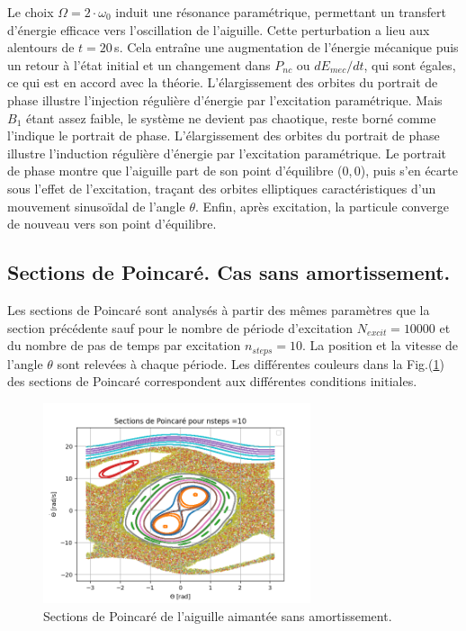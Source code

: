 \documentclass[a4paper,12pt,twoside]{article}
\begin{document}
Le choix $\Omega = 2 \cdot \omega_0$ induit une résonance paramétrique, permettant un transfert d’énergie efficace vers l’oscillation de l’aiguille. Cette perturbation a lieu aux alentours de $t=20$\,s. Cela entraîne une augmentation de l’énergie mécanique puis un retour à l'état initial et un changement dans $P_{nc}$ ou $dE_{mec}/dt$, qui sont égales, ce qui est en accord avec la théorie. L'élargissement des orbites du portrait de phase illustre l’injection régulière d’énergie par l’excitation paramétrique. Mais $B_1$ étant assez faible, le système ne devient pas chaotique, reste borné comme l'indique le portrait de phase. L'élargissement des orbites du portrait de phase illustre l’induction régulière d’énergie par l’excitation paramétrique. Le portrait de phase montre que l’aiguille part de son point d’équilibre (0,\,0), puis s’en écarte sous l’effet de l’excitation, traçant des orbites elliptiques caractéristiques d’un mouvement sinusoïdal de l’angle $\theta$. Enfin, après excitation, la particule converge de nouveau vers son point d’équilibre.


\vspace{-0.5cm}

\subsection{Sections de Poincaré. Cas sans amortissement.}  \label{sec3.4}

\vspace{-0.3cm}

Les sections de Poincaré sont analysés à partir des mêmes paramètres que la section précédente sauf pour le nombre de période d'excitation $N_{excit}=10000$ et du nombre de pas de temps par excitation $n_{steps}=10$. La position et la vitesse de l'angle $\theta$ sont relevées à chaque période. Les différentes couleurs dans la Fig.(\ref{fig6}) des sections de Poincaré correspondent aux différentes conditions initiales.

\vspace{-0.3cm}

\begin{figure}[H]
    \centering
    \includegraphics[width=0.7\textwidth]{graphes/question_3.png}
    \captionsetup{justification=centering}
    \caption{Sections de Poincaré de l'aiguille aimantée sans amortissement.}
    \label{fig6}
\end{figure}
\end{document}
